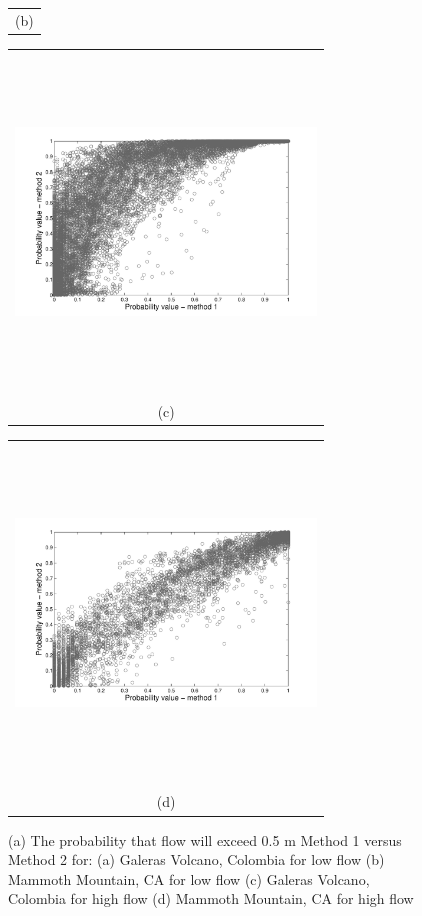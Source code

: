 \documentclass[12pt]{article}
\newcommand{\Pic}[2][0.85]{\begin{center}\texttt{[image: \#2]}
 \end{center} }
\begin{document}
\begin{figure}[H]
\begin{minipage}{0.6\textwidth}
\begin{tabular}{c}
        (b)
        \end{tabular}
    \end{minipage} 
        \begin{minipage}[b]{0.6\textwidth}
        \begin{tabular}{c}
       \includegraphics[width=8cm,height=9cm,keepaspectratio]{figs_pdf/cloud_Galeras_high.pdf}\\
        (c)
        \end{tabular}
    \end{minipage}
    \begin{minipage}{0.6\textwidth}
        \begin{tabular}{c}
	\includegraphics[width=8cm,height=9cm,keepaspectratio]{figs_pdf/cloud_Mammoth_high.pdf}\\
        (d)
        \end{tabular}
    \end{minipage}
    \caption{(a) The probability that flow will exceed 0.5 m Method 1
      versus Method 2 for: (a) Galeras Volcano, Colombia for low flow
      (b) Mammoth Mountain, CA for low flow (c) Galeras Volcano,
      Colombia for high flow (d) Mammoth Mountain, CA for high flow }
\label{fig6}  
\end{figure}
\end{document}
